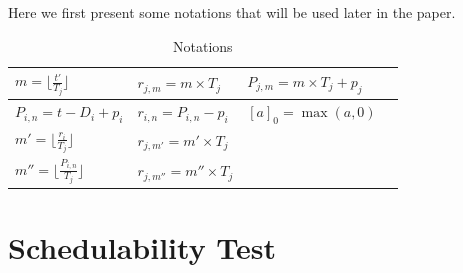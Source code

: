 \documentclass[12pt,conference,twocolumn]{IEEEtran}
\renewcommand{\ae}[1]{{\color{red}{#1}}}
\begin{document}





Here we first present some notations that  will be used later in the paper.
\begin{table}[h]
\caption{Notations}
\label{tab:x}
\center
\begin{tabular}{|l|l|l|l|}
 \hline
 $m=\lfloor \frac{t'}{T_j}\rfloor$ & $r_{j,m}=m\times T_j$ &$P_{j,m}=m\times T_j+p_j$ \\
 \hline
$P_{i,n}=t-D_i+p_i$ & $r_{i,n}=P_{i,n}-p_i$ &$[a]_0=\max(a,0)$\\
 \hline
$m'=\lfloor \frac{r_i}{T_j}\rfloor$  & $r_{j,m'}=m'\times T_j$& \\
 \hline
	$m''=\lfloor \frac{P_{i,n}}{T_j}\rfloor$ &  $r_{j,m''}=m''\times T_j$&	\\
  \hline
\end{tabular}
\end{table}

\section{Schedulability Test}






\end{document}
